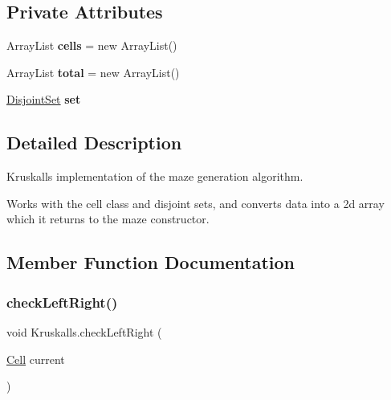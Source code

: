 \subsection*{Private Attributes}
\begin{DoxyCompactItemize}
\item 
\mbox{\label{class_kruskalls_a1fe57b54d454032507dc58a4db6c2ae3}} 
Array\+List {\bfseries cells} = new Array\+List()
\item 
\mbox{\label{class_kruskalls_aecf08d53a08b4d3a4fafc99e8d75ece3}} 
Array\+List {\bfseries total} = new Array\+List()
\item 
\mbox{\label{class_kruskalls_a5420bfe8060622b929ff303c1ec45586}} 
\mbox{\hyperlink{class_disjoint_set}{Disjoint\+Set}} {\bfseries set}
\end{DoxyCompactItemize}


\subsection{Detailed Description}
Kruskall\textquotesingle{}s implementation of the maze generation algorithm. 

Works with the cell class and disjoint sets, and converts data into a 2d array which it returns to the maze constructor. 

\subsection{Member Function Documentation}
\mbox{\label{class_kruskalls_a0d49a73f9f959a380ee6b89f818e2666}} 
\subsubsection{\texorpdfstring{checkLeftRight()}{checkLeftRight()}}
{\footnotesize\ttfamily void Kruskalls.\+check\+Left\+Right (\begin{DoxyParamCaption}\item[{\mbox{\hyperlink{class_cell}{Cell}}}]{current }\end{DoxyParamCaption})\hspace{0.3cm}{\ttfamily [private]}}



